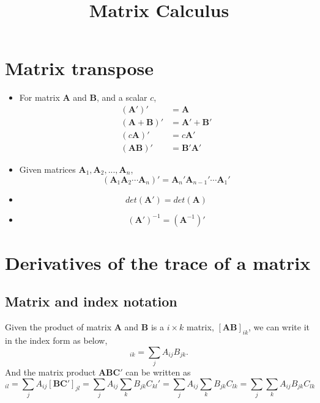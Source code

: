 \documentclass[10pt]{article}
\title{Matrix Calculus}
\author{}
\date{}
\begin{document}
\maketitle
\tableofcontents


\section{Matrix transpose}

\begin{itemize}
\item 
For matrix $ \bm{A} $ and $ \bm{B} $, and a scalar $ c $,
\begin{align*}
(\bm{A}')' &= \bm{A}\\
(\bm{A} + \bm{B})' &= \bm{A}' + \bm{B}'\\
(c\bm{A})' &= c\bm{A}'\\
(\bm{A}\bm{B})'&= \bm{B}'\bm{A}'
\end{align*}
\item 
Given matrices $ \bm{A}_{1}, \bm{A}_{2},..., \bm{A}_{n} $, 
\begin{equation}
(\bm{A}_{1}\bm{A}_{2}\cdots \bm{A}_{n})' = \bm{A}_{n}'\bm{A}_{n - 1}'\cdots \bm{A}_{1}'
\end{equation}

\item 
		\begin{equation}
		det(\bm{A}') = det(\bm{A})
		\end{equation}
\item 
		\begin{equation}
		(\bm{A}')^{ - 1} = (\bm{A}^{ - 1})'
		\end{equation}


\end{itemize}


\section{Derivatives of the trace of a matrix}
\subsection{Matrix and index notation}
Given the product of matrix $ \bm{A} $ and $ \bm{B} $ is
a $ i  \times k $ matrix, $ [ \bm{AB}]_{ik} $,
we can write it in the index form as below,
\begin{equation}
		[\bm{AB}]_{ik} = \sum\limits_{j}A_{ij}B_{jk}.
\end{equation}
And the matrix product $ \bm{ABC}' $ can be written as
\begin{equation}
[\bm{ABC}']_{il} = \sum\limits_{j}A_{ij}[\bm{BC}']_{jl}
=\sum\limits_{j}A_{ij} \sum\limits_{k}B_{jk}C_{kl}'
=\sum\limits_{j}A_{ij} \sum\limits_{k}B_{jk}C_{lk}
=\sum\limits_{j} \sum\limits_{k}A_{ij}B_{jk}C_{lk}
\end{equation}
\end{document}

